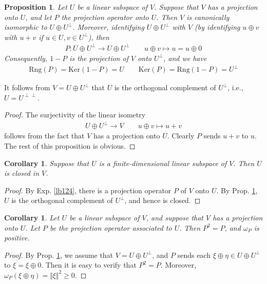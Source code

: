 \documentclass[12pt,b5paper,notitlepage]{article}
\theoremstyle{definition}
\theoremstyle{plain}
\newtheorem{pp}[df]{Proposition}
\newtheorem{co}[df]{Corollary}
\newcommand{\Ker}{\mathrm{Ker}}
\newcommand{\Rng}{\mathrm{Rng}}
\numberwithin{equation}{section}
\begin{document}
\begin{pp}\label{lb146}
Let $U$ be a linear subspace of $V$. Suppose that $V$ has a projection onto $U$, and let $P$ the projection operator onto $U$. Then $V$ is canonically isomorphic to $U\oplus U^\perp$. Moreover, identifying $U\oplus U^\perp$ with $V$ (by identifying $u\oplus v$ with $u+v$ if $u\in U,v\in U^\perp$), then
\begin{align*}
P:U\oplus U^\perp\rightarrow U\oplus U^\perp\qquad u\oplus v\mapsto u=u\oplus 0
\end{align*}
Consequently, $1-P$ is the projection of $V$ onto $U^\perp$, and we have 
\begin{align}\label{eq140}
\Rng(P)=\Ker(1-P)=U\qquad \Ker(P)=\Rng(1-P)=U^\perp
\end{align}
\end{pp}

It follows from $V=U\oplus U^\perp$ that $U$ is the orthogonal complement of $U^\perp$, i.e., $U=U^{\perp\perp}$.

\begin{proof}
The surjectivity of the linear isometry
\begin{gather*}
U\oplus U^\perp\rightarrow V\qquad u\oplus v\mapsto u+v
\end{gather*}
follows from the fact that $V$ has a projection onto $U$. Clearly $P$ sends $u+v$ to $u$. The rest of this proposition is obvious.
\end{proof}




\begin{co}
Suppose that $U$ is a finite-dimensional linear subspace of $V$. Then $U$ is closed in $V$.
\end{co}


\begin{proof}
By Exp. \ref{lb124}, there is a projection operator $P$ of $V$ onto $U$. By Prop. \ref{lb146}, $U$ is the orthogonal complement of $U^\perp$, and hence is closed.
\end{proof}


\begin{co}\label{lb171}
Let $U$ be a linear subspace of $V$, and suppose that $V$ has a projection onto $U$. Let $P$ be the projection operator associated to $U$. Then $P^2=P$, and $\omega_P$ is positive.
\end{co}


\begin{proof}
By Prop. \ref{lb146}, we assume that $V=U\oplus U^\perp$, and $P$ sends each $\xi\oplus\eta\in U\oplus U^\perp$ to $\xi=\xi\oplus 0$. Then it is easy to verify that $P^2=P$. Moreover, $\omega_P(\xi\oplus\eta)=\Vert\xi\Vert^2\geq0$.
\end{proof}
\end{document}
